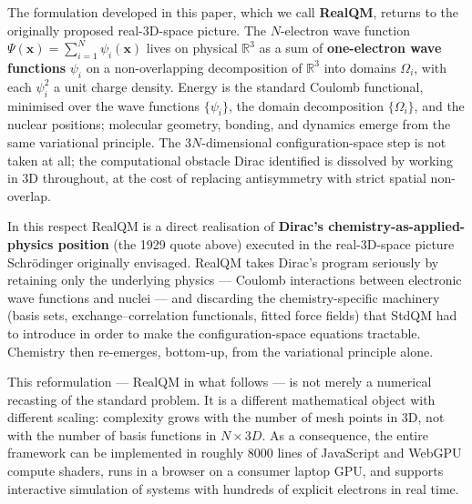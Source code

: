 \documentclass[11pt]{article}
\begin{document}
The formulation developed in this paper, which we call \textbf{RealQM}, returns to the originally proposed real-3D-space picture. The $N$-electron wave function $\Psi(\mathbf{x}) = \sum_{i=1}^N \psi_i(\mathbf{x})$ lives on physical $\mathbb{R}^3$ as a sum of \textbf{one-electron wave functions} $\psi_i$ on a non-overlapping decomposition of $\mathbb{R}^3$ into domains $\Omega_i$, with each $\psi_i^2$ a unit charge density. Energy is the standard Coulomb functional, minimised over the wave functions $\{\psi_i\}$, the domain decomposition $\{\Omega_i\}$, and the nuclear positions; molecular geometry, bonding, and dynamics emerge from the same variational principle. The $3N$-dimensional configuration-space step is not taken at all; the computational obstacle Dirac identified is dissolved by working in 3D throughout, at the cost of replacing antisymmetry with strict spatial non-overlap.

In this respect RealQM is a direct realisation of \textbf{Dirac's chemistry-as-applied-physics position} (the 1929 quote above) executed in the real-3D-space picture Schr\"odinger originally envisaged. RealQM takes Dirac's program seriously by retaining only the underlying physics --- Coulomb interactions between electronic wave functions and nuclei --- and discarding the chemistry-specific machinery (basis sets, exchange--correlation functionals, fitted force fields) that StdQM had to introduce in order to make the configuration-space equations tractable. Chemistry then re-emerges, bottom-up, from the variational principle alone.

This reformulation --- RealQM in what follows --- is not merely a numerical recasting of the standard problem. It is a different mathematical object with different scaling: complexity grows with the number of mesh points in 3D, not with the number of basis functions in $N \times 3D$. As a consequence, the entire framework can be implemented in roughly 8000 lines of JavaScript and WebGPU compute shaders, runs in a browser on a consumer laptop GPU, and supports interactive simulation of systems with hundreds of explicit electrons in real time.
\end{document}
